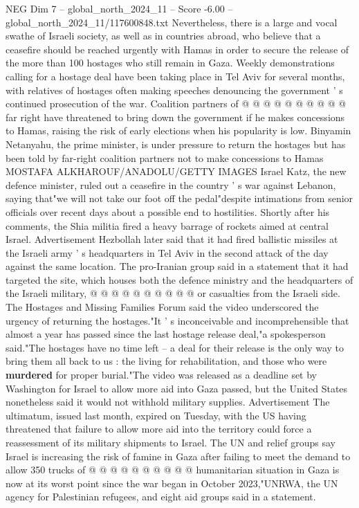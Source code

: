 \begin{textsample}{NEG Dim 7 – global\_north\_2024\_11 – Score -6.00 – global\_north\_2024\_11/117600848.txt}
Nevertheless, there is a large and vocal swathe of Israeli society, as well as in countries abroad, who believe that a ceasefire should be reached urgently with Hamas in order to secure the release of the more than 100 hostages who still remain in Gaza.
Weekly demonstrations calling for a hostage deal have been taking place in Tel Aviv for several months, with relatives of hostages often making speeches denouncing the government ' s continued prosecution of the war.
Coalition partners of @ @ @ @ @ @ @ @ @ @ far right have threatened to bring down the government if he makes concessions to Hamas, raising the risk of early elections when his popularity is low.
Binyamin Netanyahu, the prime minister, is under pressure to return the hostages but has been told by far-right coalition partners not to make concessions to Hamas MOSTAFA ALKHAROUF/ANADOLU/GETTY IMAGES Israel Katz, the new defence minister, ruled out a ceasefire in the country ' s war against Lebanon, saying that"we will not take our foot off the pedal"despite intimations from senior officials over recent days about a possible end to hostilities.
Shortly after his comments, the Shia militia fired a heavy barrage of rockets aimed at central Israel.
Advertisement Hezbollah later said that it had fired ballistic missiles at the Israeli army ' s headquarters in Tel Aviv in the second attack of the day against the same location.
The pro-Iranian group said in a statement that it had targeted the site, which houses both the defence ministry and the headquarters of the Israeli military, @ @ @ @ @ @ @ @ @ @ or casualties from the Israeli side.
The Hostages and Missing Families Forum said the video underscored the urgency of returning the hostages."It ' s inconceivable and incomprehensible that almost a year has passed since the last hostage release deal,"a spokesperson said."The hostages have no time left -- a deal for their release is the only way to bring them all back to us : the living for rehabilitation, and those who were \textbf{murdered} for proper burial."The video was released as a deadline set by Washington for Israel to allow more aid into Gaza passed, but the United States nonetheless said it would not withhold military supplies.
Advertisement The ultimatum, issued last month, expired on Tuesday, with the US having threatened that failure to allow more aid into the territory could force a reassessment of its military shipments to Israel.
The UN and relief groups say Israel is increasing the risk of famine in Gaza after failing to meet the demand to allow 350 trucks of @ @ @ @ @ @ @ @ @ @ humanitarian situation in Gaza is now at its worst point since the war began in October 2023,"UNRWA, the UN agency for Palestinian refugees, and eight aid groups said in a statement.

\end{textsample}
